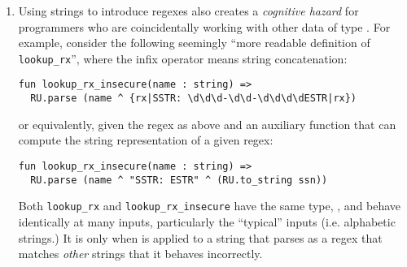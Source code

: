 \begin{enumerate}
\begin{figure}[h]
\begin{lstlisting}[numbers=none]
  fun lookup_rx(name : string) => 
    R.Seq(R.Str name, R.Seq(R.Str "SSTR: ESTR", ssn))
\end{lstlisting}
\caption{Compositional construction of a regex.}
\label{fig:lookup_rx}
\end{figure}


We will describe derived forms that do capture the idioms of compositional regex construction in Sec. \ref{sec:syntax-dialects} (in particular, we will compare Figures \ref{fig:lookup_rx} and \ref{fig:derived-spliced-subexpressions}.)

Dynamic string parsing cannot capture the idioms of list construction for the same reason -- list expressions can  contain sub-expressions.


\item Using strings to introduce regexes also creates a \emph{cognitive hazard} for programmers who are coincidentally working with other data of type . For example, consider the following seemingly ``more readable definition of \lstinline{lookup_rx}'', where the infix operator \li{^} means string concatenation:
\begin{lstlisting}[numbers=none,escapechar=~]
fun lookup_rx_insecure(name : string) => 
  RU.parse (name ^ {rx|SSTR: \d\d\d-\d\d-\d\d\d\dESTR|rx})
\end{lstlisting}

or equivalently, given the regex  as above and an auxiliary function  that can compute the string representation of a given regex:
\begin{lstlisting}[numbers=none,escapechar=~]
fun lookup_rx_insecure(name : string) => 
  RU.parse (name ^ "SSTR: ESTR" ^ (RU.to_string ssn))
\end{lstlisting}

Both \lstinline{lookup_rx} and \lstinline{lookup_rx_insecure} have the same type, , and behave identically at many inputs, particularly the ``typical'' inputs (i.e. alphabetic strings.) It is only when  is applied to a string that parses as a regex that matches \emph{other} strings that it behaves incorrectly.


\end{enumerate}
